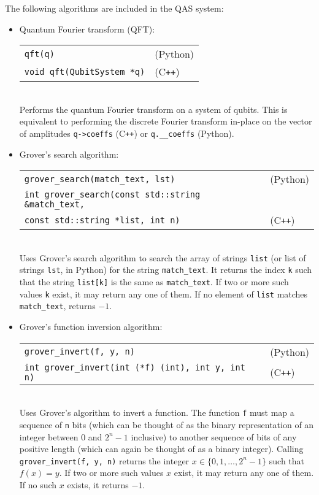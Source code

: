 \documentclass{article}
\newcommand{\cpp}{C{}\texttt{++}}
\begin{document}
The following algorithms are included in the QAS system: 
\begin{itemize} 
\item Quantum Fourier transform (QFT):\\
\begin{tabular}{ll}
\verb~qft(q)~ & (Python) \\
\verb~void qft(QubitSystem *q)~ & (\cpp) 
\end{tabular} \\
Performs the quantum Fourier transform on a system of qubits. This is equivalent to performing the discrete Fourier transform in-place on the vector of amplitudes \verb~q->coeffs~ (\cpp) or \verb~q.__coeffs~ (Python).

\item Grover's search algorithm:\\
\begin{tabular}{ll}
\verb~grover_search(match_text, lst)~ & (Python) \\
\verb~int grover_search(const std::string &match_text,~ \\
\hspace{9em} \verb~const std::string *list, int n)~ & (\cpp) 
\end{tabular} \\
Uses Grover's search algorithm to search the array of strings \verb~list~ (or list of strings \verb~lst~, in Python) for the string \verb~match_text~. It returns the index \verb~k~ such that the string \verb~list[k]~ is the same as \verb~match_text~. If two or more such values \verb~k~ exist, it may return any one of them. If no element of \verb~list~ matches \verb~match_text~, returns $-1$. 

\item Grover's function inversion algorithm:\\
\begin{tabular}{ll}
\verb~grover_invert(f, y, n)~ & (Python) \\
\verb~int grover_invert(int (*f) (int), int y, int n)~ & (\cpp)  
\end{tabular} \\
Uses Grover's algorithm to invert a function. The function \verb~f~ must map a sequence of \verb~n~ bits (which can be thought of as the binary representation of an integer between 0 and $2^n - 1$ inclusive) to another sequence of bits of any positive length (which can again be thought of as a binary integer). Calling \verb~grover_invert(f, y, n)~ returns the integer $x \in \{0, 1, \dots, 2^n-1\}$ such that $f(x) = y$. If two or more such values $x$ exist, it may return any one of them. If no such $x$ exists, it returns $-1$. 


\end{itemize}
\end{document}
